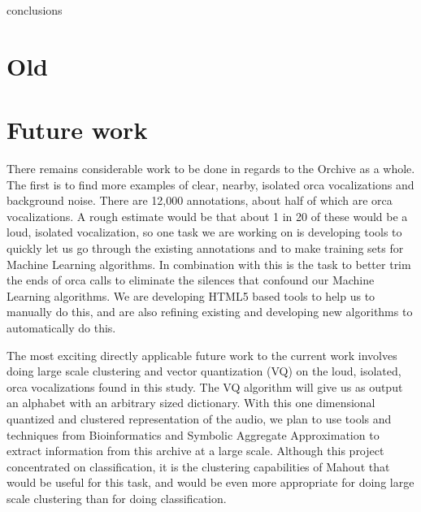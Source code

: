 \documentclass[12pt,oneside]{book}
\begin{document}


\label{chapter:conclusion}

conclusions



\section{Old}


\section{Future work}


There remains considerable work to be done in regards to the Orchive
as a whole.  The first is to find more examples of clear, nearby,
isolated orca vocalizations and background noise.  There are 12,000
annotations, about half of which are orca vocalizations.  A rough
estimate would be that about 1 in 20 of these would be a loud,
isolated vocalization, so one task we are working on is developing
tools to quickly let us go through the existing annotations and to
make training sets for Machine Learning algorithms.  In combination
with this is the task to better trim the ends of orca calls to
eliminate the silences that confound our Machine Learning algorithms.
We are developing HTML5 based tools to help us to manually do this,
and are also refining existing and developing new algorithms to
automatically do this.

The most exciting directly applicable future work to the current work
involves doing large scale clustering and vector quantization (VQ) on
the loud, isolated, orca vocalizations found in this study.  The VQ
algorithm will give us as output an alphabet with an arbitrary sized
dictionary.  With this one dimensional quantized and clustered
representation of the audio, we plan to use tools and techniques from
Bioinformatics \cite{sarkar2002} and Symbolic Aggregate Approximation
\cite{lin07} to extract information from this archive at a large scale.
Although this project concentrated on classification, it is the
clustering capabilities of Mahout that would be useful for this task,
and would be even more appropriate for doing large scale clustering
than for doing classification.
\end{document}
